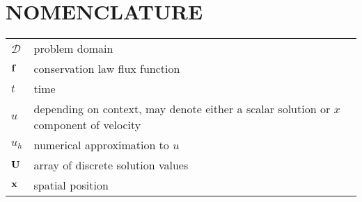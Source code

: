 \chapter*{NOMENCLATURE}

\begin{tabular}{l p{5in}}
$\mathcal{D}$ & problem domain\\
$\mathbf{f}$  & conservation law flux function\\
$t$   & time\\
$u$   & depending on context, may denote either a scalar solution or $x$ component
        of velocity\\
$u_h$ & numerical approximation to $u$\\
$\mathbf{U}$  & array of discrete solution values\\
$\mathbf{x}$  & spatial position\\
\end{tabular}

\pagebreak{}
